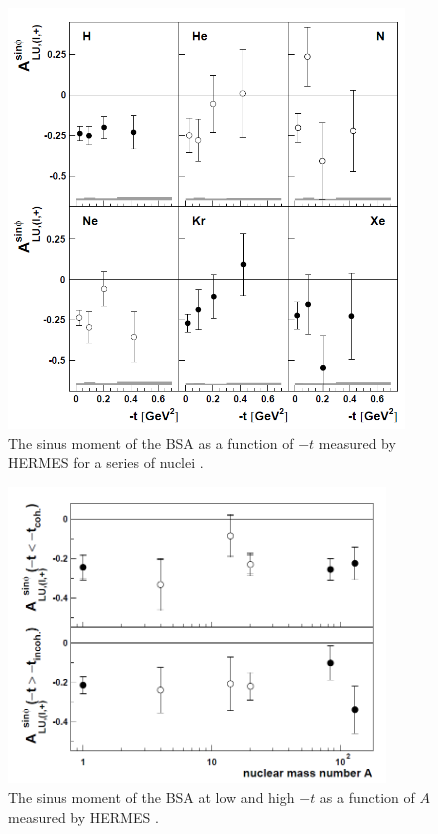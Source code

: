 \documentclass[aps,prc,preprint,superscriptaddress]{revtex4}
\begin{document}
\begin{figure}[tbp!]
\center
	\includegraphics[width=10.5cm]{fig3/HERMES_BSA.png}
	\caption{The sinus moment of the BSA as a function of $-t$ measured by HERMES
	for a series of nuclei \cite{Airapetian:2009cga}.}
\label{fig:HERMES1}
\end{figure}

\begin{figure}[tbp!]
\center
\includegraphics[width=10cm]{fig3/HERMES_BSA_2.png}
\caption{The sinus moment of the BSA at low and high $-t$ as a function of $A$ measured by HERMES
	\cite{Airapetian:2009cga}.}
\label{fig:HERMES2}
\end{figure}
\end{document}
